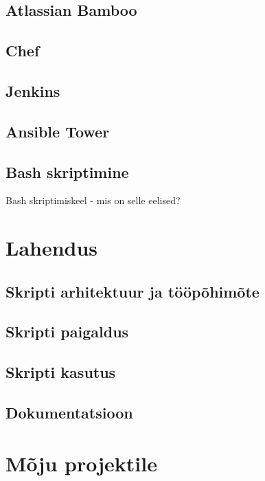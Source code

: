 \documentclass[12pt]{report}
\begin{document}
  
  \subsection{Atlassian Bamboo}
  \cite{bamboo}
  
  \subsection{Chef}
  \cite{chef}
  
  \subsection{Jenkins}
  \cite{jenkins}
  
  \subsection{Ansible Tower}
  \cite{ansible}

  \subsection{Bash skriptimine}
  \cite{bash}
  Bash skriptimiskeel - mis on selle eelised?
  
  \newpage
  
  \section{Lahendus}
  
  \subsection{Skripti arhitektuur ja tööpõhimõte}
  
  \subsection{Skripti paigaldus}
  
  \subsection{Skripti kasutus}
  
  \subsection{Dokumentatsioon}
  
  \newpage
  
  \section{Mõju projektile}
  
\end{document}
